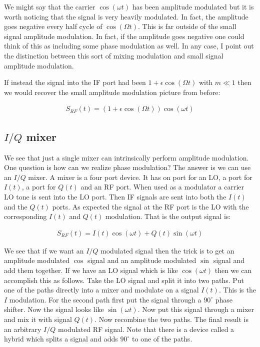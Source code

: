 \documentclass[12pt]{article}
\begin{document}
We might say that the carrier $\cos(\omega t)$ has been amplitude modulated but it is worth noticing that the signal is very heavily modulated. In fact, the amplitude goes negative every half cycle of $\cos(\Omega t)$. This is far outside of the small signal amplitude modulation. In fact, if the amplitude goes negative one could think of this as including some phase modulation as well. In any case, I point out the distinction between this sort of mixing modulation and small signal amplitude modulation.

If instead the signal into the IF port had been $1+\epsilon\cos(\Omega t)$ with $m\ll 1$ then we would recover the small amplitude modulation picture from before:

\begin{align}
S_{RF}(t) = (1+\epsilon\cos(\Omega t))\cos(\omega t)
\end{align}

\subsection{$I/Q$ mixer}

We see that just a single mixer can intrinsically perform amplitude modulation. One question is how can we realize phase modulation? The answer is we can use an $I/Q$ mixer. A mixer is a four port device. It has on port for an LO, a port for $I(t)$, a port for $Q(t)$ and an RF port. When used as a modulator a carrier LO tone is sent into the LO port. Then IF signals are sent into both the $I(t)$ and the $Q(t)$ ports. As expected the signal at the RF port is the LO with the corresponding $I(t)$ and $Q(t)$ modulation. That is the output signal is:

\begin{align}
S_{RF}(t) = I(t)\cos(\omega t) + Q(t)\sin(\omega t)
\end{align}

We see that if we want an $I/Q$ modulated signal then the trick is to get an amplitude modulated $\cos$ signal and an amplitude modulated $\sin$ signal and add them together. If we have an LO signal which is like $\cos(\omega t)$ then we can accomplish this as follows. Take the LO signal and split it into two paths. Put one of the paths directly into a mixer and modulate on a signal $I(t)$. This is the $I$ modulation. For the second path first put the signal through a $90^{\circ}$ phase shifter. Now the signal looks like $\sin(\omega t)$. Now put this signal through a mixer and mix it with signal $Q(t)$. Now recombine the two paths. The final result is an arbitrary $I/Q$ modulated RF signal. Note that there is a device called a hybrid which splits a signal and adds $90^{\circ}$ to one of the paths.
\end{document}
